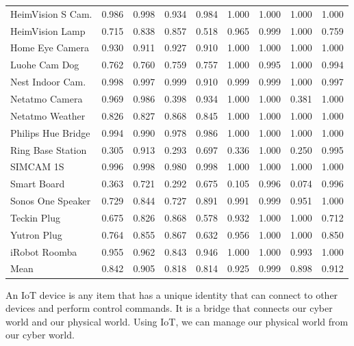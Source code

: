 \documentclass[journal]{IEEEtran}
\begin{document}
\begin{table}[htbp]
\begin{tabular}{@{}lrrrrrrrr@{}}
		HeimVision S Cam. & 0.986 & 0.998 & 0.934 & 0.984 & 1.000 & 1.000 & 1.000 & 1.000 \\
		HeimVision Lamp & 0.715 & 0.838 & 0.857 & 0.518 & 0.965 & 0.999 & 1.000 & 0.759 \\
		Home Eye Camera & 0.930 & 0.911 & 0.927 & 0.910 & 1.000 & 1.000 & 1.000 & 1.000 \\
		Luohe Cam Dog & 0.762 & 0.760 & 0.759 & 0.757 & 1.000 & 0.995 & 1.000 & 0.994 \\
		Nest Indoor Cam. & 0.998 & 0.997 & 0.999 & 0.910 & 0.999 & 0.999 & 1.000 & 0.997 \\
		Netatmo Camera & 0.969 & 0.986 & 0.398 & 0.934 & 1.000 & 1.000 & 0.381 & 1.000 \\
		Netatmo Weather & 0.826 & 0.827 & 0.868 & 0.845 & 1.000 & 1.000 & 1.000 & 1.000 \\
		Philips Hue Bridge & 0.994 & 0.990 & 0.978 & 0.986 & 1.000 & 1.000 & 1.000 & 1.000 \\
		Ring Base Station & 0.305 & 0.913 & 0.293 & 0.697 & 0.336 & 1.000 & 0.250 & 0.995 \\
		SIMCAM 1S & 0.996 & 0.998 & 0.980 & 0.998 & 1.000 & 1.000 & 1.000 & 1.000 \\
		Smart Board & 0.363 & 0.721 & 0.292 & 0.675 & 0.105 & 0.996 & 0.074 & 0.996 \\
		Sonos One Speaker & 0.729 & 0.844 & 0.727 & 0.891 & 0.991 & 0.999 & 0.951 & 1.000 \\
		Teckin Plug & 0.675 & 0.826 & 0.868 & 0.578 & 0.932 & 1.000 & 1.000 & 0.712 \\
		Yutron Plug & 0.764 & 0.855 & 0.867 & 0.632 & 0.956 & 1.000 & 1.000 & 0.850 \\
		iRobot Roomba & 0.955 & 0.962 & 0.843 & 0.946 & 1.000 & 1.000 & 0.993 & 1.000 \\
		\midrule
		Mean  & 0.842 & 0.905 & 0.818 & 0.814 & 0.925 & 0.999 & 0.898 & 0.912 \\
		\bottomrule
	\end{tabular}%
	\label{tab:addlabel}%
\end{table}%











\clearpage

An IoT device is any item that has a unique identity that can connect to other devices and perform control commands\cite{al2015internet}. It is a bridge that connects our cyber world and our physical world\cite{patel2018internet}. Using IoT, we can manage our physical world from our cyber world.
\end{document}
